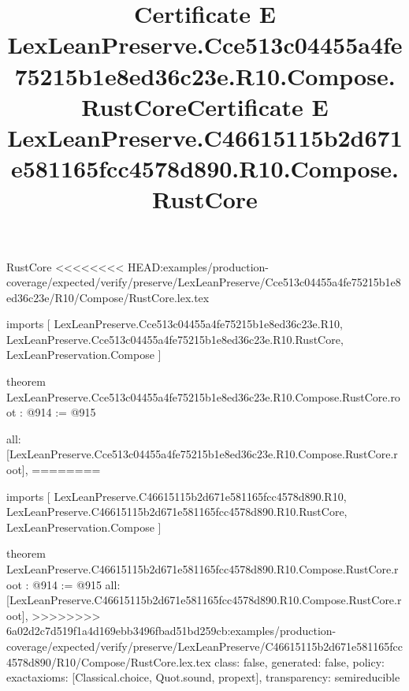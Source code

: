 \begin{lexlean}{RustCore}
<<<<<<<< HEAD:examples/production-coverage/expected/verify/preserve/LexLeanPreserve/Cce513c04455a4fe75215b1e8ed36c23e/R10/Compose/RustCore.lex.tex
\title{Certificate E LexLeanPreserve.Cce513c04455a4fe75215b1e8ed36c23e.R10.Compose.RustCore}
\begin{coremodule}
imports [
  LexLeanPreserve.Cce513c04455a4fe75215b1e8ed36c23e.R10,
  LexLeanPreserve.Cce513c04455a4fe75215b1e8ed36c23e.R10.RustCore,
  LexLeanPreservation.Compose
]

theorem LexLeanPreserve.Cce513c04455a4fe75215b1e8ed36c23e.R10.Compose.RustCore.root : @914 := @915 {
  all: [LexLeanPreserve.Cce513c04455a4fe75215b1e8ed36c23e.R10.Compose.RustCore.root],
========
\title{Certificate E LexLeanPreserve.C46615115b2d671e581165fcc4578d890.R10.Compose.RustCore}
\begin{coremodule}
imports [
  LexLeanPreserve.C46615115b2d671e581165fcc4578d890.R10,
  LexLeanPreserve.C46615115b2d671e581165fcc4578d890.R10.RustCore,
  LexLeanPreservation.Compose
]

theorem LexLeanPreserve.C46615115b2d671e581165fcc4578d890.R10.Compose.RustCore.root : @914 := @915 {
  all: [LexLeanPreserve.C46615115b2d671e581165fcc4578d890.R10.Compose.RustCore.root],
>>>>>>>> 6a02d2c7d519f1a4d169ebb3496fbad51bd259cb:examples/production-coverage/expected/verify/preserve/LexLeanPreserve/C46615115b2d671e581165fcc4578d890/R10/Compose/RustCore.lex.tex
  class: false,
  generated: false,
  policy: exact{axioms: [Classical.choice, Quot.sound, propext]},
  transparency: semireducible
}


\end{coremodule}}
\end{coremodule}
\end{lexlean}

